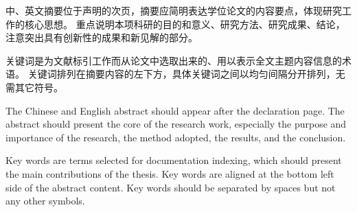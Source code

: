 \begin{cabstract}
  中、英文摘要位于声明的次页，摘要应简明表达学位论文的内容要点，体现研究工作的核心思想。
  重点说明本项科研的目的和意义、研究方法、研究成果、结论，注意突出具有创新性的成果和新见解的部分。

  关键词是为文献标引工作而从论文中选取出来的、用以表示全文主题内容信息的术语。
  关键词排列在摘要内容的左下方，具体关键词之间以均匀间隔分开排列，无需其它符号。
\end{cabstract}

\begin{eabstract}
 The Chinese and English abstract should appear after the declaration page.
 The abstract should present the core of the research work, especially the purpose and importance of the research, the method adopted, the results, and the conclusion.

 Key words are terms selected for documentation indexing, which should present the main contributions of the thesis.
 Key words are aligned at the bottom left side of the abstract content.
 Key words should be separated by spaces but not any other symbols.
\end{eabstract}